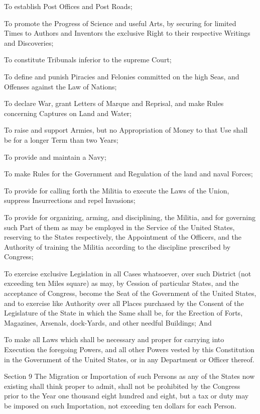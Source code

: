 \documentclass{article}
\begin{document}
To establish Post Offices and Post Roads;

To promote the Progress of Science and useful Arts, by securing for limited
Times to Authors and Inventors the exclusive Right to their respective Writings
and Discoveries;

To constitute Tribunals inferior to the supreme Court;

To define and punish Piracies and Felonies committed on the high Seas, and
Offenses against the Law of Nations;

To declare War, grant Letters of Marque and Reprisal, and make Rules concerning
Captures on Land and Water;

To raise and support Armies, but no Appropriation of Money to that Use shall be
for a longer Term than two Years;

To provide and maintain a Navy;

To make Rules for the Government and Regulation of the land and naval Forces;

To provide for calling forth the Militia to execute the Laws of the Union,
suppress Insurrections and repel Invasions;

To provide for organizing, arming, and disciplining, the Militia, and for
governing such Part of them as may be employed in the Service of the United
States, reserving to the States respectively, the Appointment of the Officers,
and the Authority of training the Militia according to the discipline
prescribed by Congress;

To exercise exclusive Legislation in all Cases whatsoever, over such District
(not exceeding ten Miles square) as may, by Cession of particular States, and
the acceptance of Congress, become the Seat of the Government of the United
States, and to exercise like Authority over all Places purchased by the Consent
of the Legislature of the State in which the Same shall be, for the Erection of
Forts, Magazines, Arsenals, dock-Yards, and other needful Buildings; And

To make all Laws which shall be necessary and proper for carrying into
Execution the foregoing Powers, and all other Powers vested by this
Constitution in the Government of the United States, or in any Department or
Officer thereof.

Section 9
The Migration or Importation of such Persons as any of the States now existing
shall think proper to admit, shall not be prohibited by the Congress prior to
the Year one thousand eight hundred and eight, but a tax or duty may be imposed
on such Importation, not exceeding ten dollars for each Person.
\end{document}
